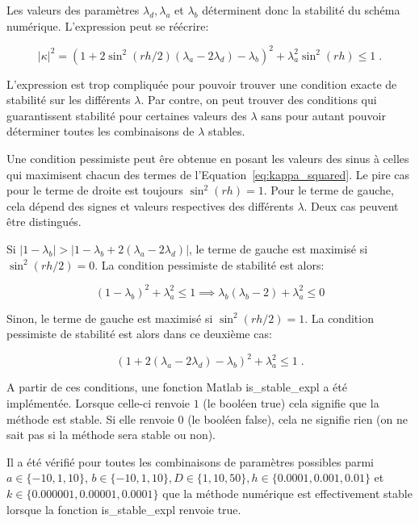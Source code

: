 \documentclass[a4paper, 12pt]{report}
\newcommand{\code}[1]{\textsf{#1}}
\begin{document}
Les valeurs des paramètres $\lambda_d, \lambda_a$ et $\lambda_b$ déterminent donc
la stabilité du schéma numérique. L'expression peut se réécrire:

\begin{equation}
\boxed{|\kappa|^2 = \left ( 1 + 2 \sin^2(rh/2) \left (\lambda_a-2\lambda_d \right )- \lambda_b \right )^2+ \lambda_a^2 \sin^2(rh) \le 1}\;.
\label{eq:kappa_squared}
\end{equation}

L'expression est trop compliquée pour pouvoir trouver une condition exacte
de stabilité sur les différents $\lambda$. Par contre, on peut trouver
des conditions qui guarantissent stabilité pour certaines valeurs des $\lambda$
sans pour autant pouvoir déterminer toutes les combinaisons de $\lambda$ stables.

Une condition pessimiste peut êre obtenue en posant les valeurs des sinus à celles
qui maximisent chacun des termes de l'Equation~\ref{eq:kappa_squared}.
Le pire cas pour le terme de droite est toujours $\sin^2(rh)=1$. Pour le terme
de gauche, cela dépend des signes et valeurs respectives des différents
$\lambda$. Deux cas peuvent être distingués.

Si $|1-\lambda_b| > |1-\lambda_b + 2 (\lambda_a-2\lambda_d)|$, le terme de gauche
est maximisé si $\sin^2(rh/2)=0$. La condition pessimiste de stabilité
est alors:

\begin{equation}
  \left (1-\lambda_b \right )^2 + \lambda_a^2 \le 1 \implies \lambda_b (\lambda_b-2) + \lambda_a^2 \le 0
\end{equation}

Sinon, le terme de gauche est maximisé si $\sin^2(rh/2)=1$. La condition
pessimiste de stabilité est alors dans ce deuxième cas:

\begin{equation}
    \left ( 1+2(\lambda_a-2\lambda_d) - \lambda_b \right )^2 + \lambda_a^2 \le 1 \;.
\end{equation}

A partir de ces conditions, une fonction Matlab \code{is\_stable\_expl} a été
implémentée. Lorsque celle-ci renvoie $1$ (le booléen \code{true}) cela signifie
que la méthode est stable. Si elle renvoie $0$ (le booléen \code{false}), cela
ne signifie rien (on ne sait pas si la méthode sera stable ou non).

Il a été vérifié pour toutes les combinaisons de paramètres possibles parmi $a \in \{-10, 1, 10\}$,
$b \in \{-10, 1, 10\}, D \in \{1, 10, 50\}, h \in \{0.0001, 0.001, 0.01\}$
et $k \in \{0.000001, 0.00001, 0.0001\}$ que la méthode numérique est
effectivement stable lorsque la fonction \code{is\_stable\_expl} renvoie \code{true}.
\end{document}
